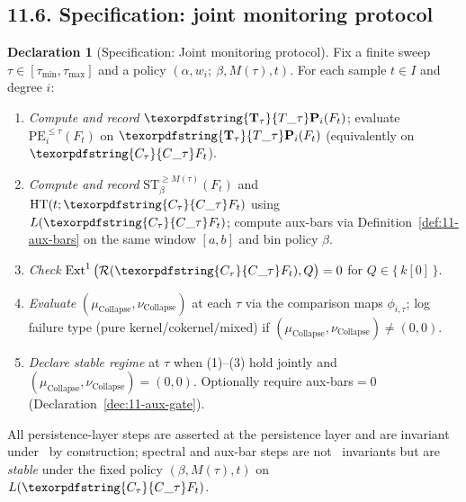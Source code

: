 \documentclass[11pt]{article}
\numberwithin{equation}{section}
\theoremstyle{plain}
\theoremstyle{definition}
\theoremstyle{remark}
\DeclareMathOperator{\Ext}{Ext}
\newcommand{\Rfun}{\mathcal{R}}
\theoremstyle{plain}
\theoremstyle{definition}
\numberwithin{equation}{section}
\theoremstyle{definition}
\newtheorem{declaration}[theorem]{Declaration}
\DeclareRobustCommand{\Ttau}{\texorpdfstring{\ensuremath{\mathbf{T}_{\tau}}}{T\_\tau}}
\DeclareRobustCommand{\Ctau}{\texorpdfstring{\ensuremath{C_{\tau}}}{C\_\tau}}
\DeclareRobustCommand{\muc}{\mu_{\mathrm{Collapse}}}
\DeclareRobustCommand{\nuc}{\nu_{\mathrm{Collapse}}}
\DeclareRobustCommand{\fqi}{\text{f.q.i.}}
\DeclareRobustCommand{\Qtest}{\{\,k[0]\,\}}
\numberwithin{equation}{section}
\theoremstyle{plain}
\theoremstyle{definition}
\theoremstyle{remark}
\providecommand{\Cfun}[1]{\mathsf{C}_{#1}}
\providecommand{\Tfun}[1]{\mathbf{T}_{#1}}
\providecommand{\Ctau}{\Cfun{\tau}}
\providecommand{\Ttau}{\Tfun{\tau}}
\providecommand{\muc}{\mu_{\mathrm{Collapse}}}
\providecommand{\nuc}{\nu_{\mathrm{Collapse}}}
\begin{document}
\subsection*{11.6. Specification: joint monitoring protocol}
\begin{declaration}[Specification: Joint monitoring protocol]\label{spec:11-monitor}
Fix a finite sweep $\tau\in[\tau_{\min},\tau_{\max}]$ and a policy $(\alpha, w_i;\ \beta, M(\tau), t)$.
For each sample $t\in I$ and degree $i$:
\begin{enumerate}
  \item \emph{Compute and record} $\Ttau\mathbf{P}_i(F_t)$; evaluate $\mathrm{PE}_{i}^{\le \tau}(F_t)$ on $\Ttau\mathbf{P}_i(F_t)$ (equivalently on $\Ctau F_t$).
  \item \emph{Compute and record} $\mathrm{ST}_{\beta}^{\ge M(\tau)}(F_t)$ and $\mathrm{HT}(t;\Ctau F_t)$ using $L(\Ctau F_t)$; compute aux-bars via Definition~\ref{def:11-aux-bars} on the same window $[a,b]$ and bin policy $\beta$.
  \item \emph{Check} $\Ext^1\big(\Rfun(\Ctau F_t),Q\big)=0$ for $Q\in\Qtest$.
  \item \emph{Evaluate} $(\muc,\nuc)$ at each $\tau$ via the comparison maps $\phi_{i,\tau}$; log failure type (pure kernel/cokernel/mixed) if $(\muc,\nuc)\neq(0,0)$.
  \item \emph{Declare stable regime} at $\tau$ when (1)–(3) hold jointly and $(\muc,\nuc)=(0,0)$. Optionally require aux-bars$=0$ (Declaration~\ref{dec:11-aux-gate}).
\end{enumerate}
All persistence-layer steps are asserted at the persistence layer and are invariant under \fqi\ by construction; spectral and aux-bar steps are not \fqi\ invariants but are \emph{stable} under the fixed policy \((\beta, M(\tau), t)\) on \(L(\Ctau F_t)\).
\end{declaration}
\end{document}

